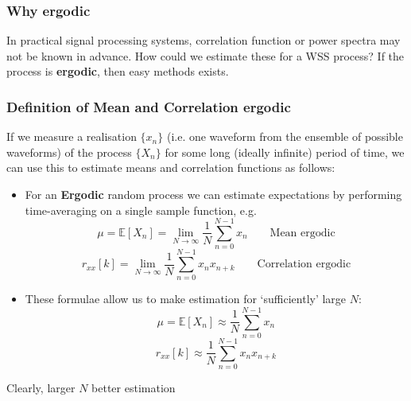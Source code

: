 \documentclass[12pt]{article}
\newcommand{\empha}[1]{\textbf{\textcolor{blue1}{#1}}}
\newcommand{\mexp}{\mathbb{E}}
\newcommand{\autocox}{r_{xx}}
\begin{document}
\subsubsection{Why ergodic}
In practical signal processing systems, correlation function or power spectra may not be known in advance. How could we estimate these for a WSS process? If the process is \empha{ergodic}, then easy methods exists.  
\subsubsection{Definition of Mean and Correlation ergodic}
If we measure a realisation $\{x_n \}$ (i.e. one waveform from the ensemble of possible waveforms) of the process $\{ X_n\}$ for some long (ideally infinite) period of time, we can use this to estimate means and correlation functions as follows:
    \begin{itemize}
        \item For an \textbf{Ergodic} random process we can estimate expectations by performing time-averaging on a single sample function, e.g.
        \[
        \mu = \mexp[X_n] = \lim_{N\rightarrow \infty} \frac{1}{N} \sum_{n=0}^{N-1}x_n \qquad \textrm{Mean ergodic} 
        \]
        \[
        \autocox[k] = \lim_{N\rightarrow \infty} \frac{1}{N} \sum_{n=0}^{N-1}x_n x_{n+k} \qquad \textrm{Correlation ergodic}
        \]
        \item These formulae allow us to make estimation for `sufficiently' large $N$:
        \[
        \mu = \mexp[X_n] \approx \frac{1}{N}\sum_{n=0}^{N-1}x_n
        \]
        \[
        \autocox[k] \approx \frac{1}{N} \sum_{n=0}^{N-1}x_n x_{n+k} 
        \]
    \end{itemize}
    Clearly, larger $N$ better estimation
\end{document}

